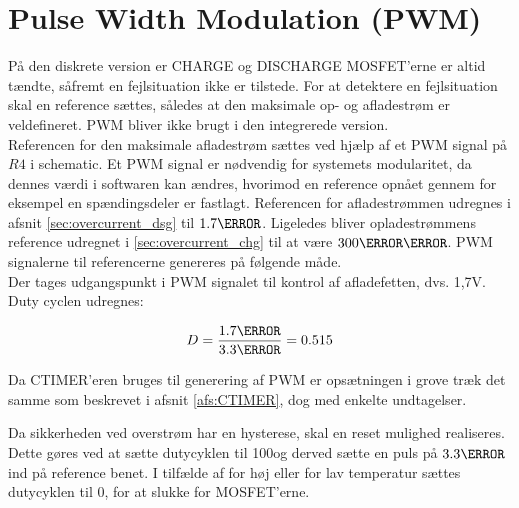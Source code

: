 \section{Pulse Width Modulation (PWM)}\label{afs:PWM}
På den diskrete version er CHARGE og DISCHARGE MOSFET'erne er altid tændte, såfremt en fejlsituation ikke er tilstede. For at detektere en fejlsituation skal en reference sættes, således at den maksimale op- og afladestrøm er veldefineret. PWM bliver ikke brugt i den integrerede version. \\

Referencen for den maksimale afladestrøm sættes ved hjælp af et PWM signal på $R4$ i schematic. Et PWM signal er nødvendig for systemets modularitet, da dennes værdi i softwaren kan ændres, hvorimod en reference opnået gennem for eksempel en spændingsdeler er fastlagt. Referencen for afladestrømmen udregnes i afsnit \ref{sec:overcurrent_dsg} til $1.7\volt$. Ligeledes bliver opladestrømmens reference udregnet i \ref{sec:overcurrent_chg} til at være $300\milli\volt$. PWM signalerne til referencerne genereres på følgende måde. \\

Der tages udgangspunkt i PWM signalet til kontrol af afladefetten, dvs. 1,7V. Duty cyclen udregnes: 

\begin {equation}
D = \frac{1.7\volt}{3.3\volt} = 0.515
\label{eq:duty}
\end {equation}

Da CTIMER'eren bruges til generering af PWM er opsætningen i grove træk det samme som beskrevet i afsnit \ref{afs:CTIMER}, dog med enkelte undtagelser. 


Da sikkerheden ved overstrøm har en hysterese, skal en reset mulighed realiseres. Dette gøres ved at sætte dutycyklen til 100\percent\space og derved sætte en puls på $3.3\volt$ ind på reference benet. I tilfælde af for høj eller for lav temperatur sættes dutycyklen til 0\percent, for at slukke for MOSFET'erne.

